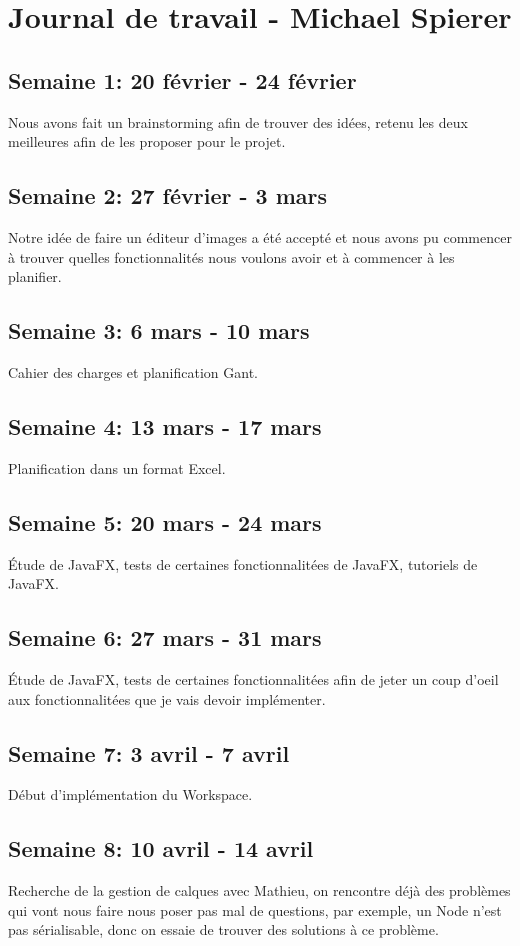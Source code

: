 \section{Journal de travail - Michael Spierer}

\subsection{Semaine 1: 20 février - 24 février}
Nous avons fait un brainstorming afin de trouver des idées, retenu les deux meilleures afin de les proposer pour le projet.
\subsection{Semaine 2: 27 février - 3 mars}
Notre idée de faire un éditeur d'images a été accepté et nous avons pu commencer à trouver quelles fonctionnalités nous voulons avoir et à commencer à les planifier. 
\subsection{Semaine 3: 6 mars - 10 mars}
Cahier des charges et planification Gant.
\subsection{Semaine 4: 13 mars - 17 mars}
Planification dans un format Excel.
\subsection{Semaine 5: 20 mars - 24 mars}
Étude de JavaFX, tests de certaines fonctionnalitées de JavaFX, tutoriels de JavaFX.
\subsection{Semaine 6: 27 mars - 31 mars}
Étude de JavaFX, tests de certaines fonctionnalitées afin de jeter un coup d'oeil aux fonctionnalitées que je vais devoir implémenter.
\subsection{Semaine 7: 3 avril - 7 avril}
Début d'implémentation du Workspace.
\subsection{Semaine 8: 10 avril - 14 avril}
Recherche de la gestion de calques avec Mathieu, on rencontre déjà des problèmes qui vont nous faire nous poser pas mal de questions, par exemple, un Node n'est pas sérialisable, donc on essaie de trouver des solutions à ce problème.
